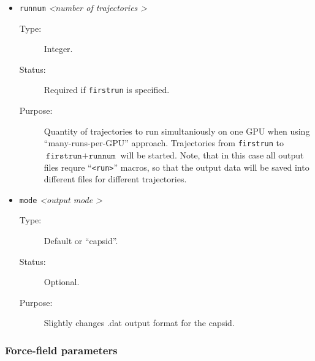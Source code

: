 \documentclass[a4paper]{article}
\begin{document}
\begin{itemize}
\item \texttt{runnum} \textit{\textless number of trajectories \textgreater}
\begin{description}
\item[Type:] Integer.
\item[Status:] Required if \texttt{firstrun} is specified. 
\item[Purpose:] Quantity of trajectories to run simultaniously on one GPU when using ``many-runs-per-GPU'' approach. Trajectories from \texttt{firstrun} to $\texttt{firstrun}+\texttt{runnum}$ will be started. Note, that in this case all output files requre ``\texttt{<run>}'' macros, so that the output data will be saved into different files for different trajectories.
\end{description}

\item \texttt{mode} \textit{\textless output mode \textgreater}
\begin{description}
\item[Type:] Default or ``capsid''.
\item[Status:] Optional.
\item[Purpose:] Slightly changes .dat output format for the capsid.
\end{description}

\end{itemize}


\subsubsection{Force-field parameters}
\label{sec:par.forcesield}
\end{document}
